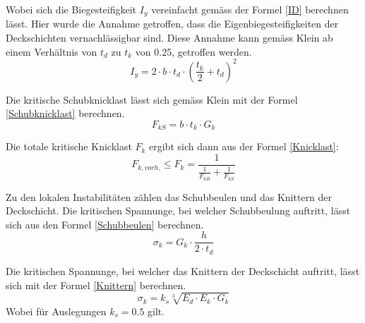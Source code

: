     Wobei sich die Biegesteifigkeit $I_y$ vereinfacht gemäss der Formel \ref{ID} berechnen lässt. Hier wurde die Annahme getroffen, dass die Eigenbiegesteifigkeiten der Deckschichten vernachlässigbar sind. Diese Annahme kann gemäss Klein \cite{klein} ab einem Verhältnis von $t_d$ zu $t_k$ von 0.25, getroffen werden.
    \begin{equation}
      \label{ID}
      I_y = 2 \cdot b \cdot t_d \cdot \left( \frac{t_k}{2} + t_d \right )^{2}
    \end{equation}

    Die kritische Schubknicklast lässt sich gemäss Klein \cite{klein} mit der Formel \ref{Schubknicklast} berechnen.
    \begin{equation}
      \label{Schubknicklast}
      F_{kS} = b \cdot t_k \cdot G_k
    \end{equation}

    Die totale kritische Knicklast \(F_k\) ergibt sich dann aus der Formel \ref{Knicklast}:
    \begin{equation}
      \label{Knicklast}
      F_{k, vorh.} \leq F_k=\frac{1}{\frac{1}{F_{kB}}+\frac{1}{F_{kS}}}
    \end{equation}

    Zu den lokalen Instabilitäten zählen das Schubbeulen und das Knittern der Deckschicht. Die kritischen Spannunge, bei welcher Schubbeulung auftritt, lässt sich aus den Formel \ref{Schubbeulen} berechnen. \cite{ETH}
    \begin{equation}
      \label{Schubbeulen}
      \sigma_k = G_k \cdot \frac{h}{2 \cdot t_d}
    \end{equation}

    Die kritischen Spannunge, bei welcher das Knittern der Deckschicht auftritt, lässt sich mit der Formel \ref{Knittern} berechnen. \cite{ETH}
    \begin{equation}
      \label{Knittern}
      \sigma_k = k_s\sqrt[3]{E_d \cdot E_k \cdot G_k}
    \end{equation}
    Wobei für Auslegungen \(k_s = 0.5\) gilt.

